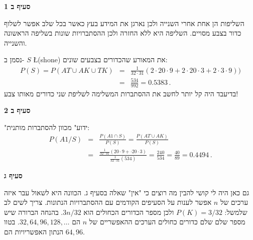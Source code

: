 \textbf{סעיף ב 1}

השליפות הן אחת אחרי השנייה ולכן נארגן את המידע בעץ כאשר בכל שלב אפשר לשלוף כדור בצבע מסויים. השליפה היא ללא החזרה ולכן ההסתברויות שונות בשליפה הראשונה והשנייה.
\begin{center}
\end{center}
נסמן ב-%
$S$ \L{(shone)}
את המאורע שהכדורים בצבעים שונים:
\begin{eqnarray*}
P(S)=P(AT\cup AK \cup TK)&=&
\frac{1}{32\cdot 31}
(2\cdot 20\cdot 9 + 2\cdot 20\cdot 3 + 2\cdot 3\cdot 9))\\[6pt]
&=&\frac{534}{992}=0.5383\,.
\end{eqnarray*}
בדיעבד היה קל יותר לחשב את ההסתברות המשלימה לשליפת שני כדורים מאותו צבע!

\textbf{סעיף ב 2}

"ידוע" מכוון להסתברות מותנית:
\begin{eqnarray*}
P(A1/S)&=&\frac{P(A1\cap S)}{P(S)}=\frac{P(AT\cup AK)}{P(S)}\\
&=&
\frac{\frac{1}{32\cdot 31}(20\cdot 9 + \cdot 20\cdot 3)}
{\frac{1}{32\cdot 31}(534)}=\frac{240}{534}=\frac{40}{89}=0.4494\,.
\end{eqnarray*}

\textbf{סעיף ג}

גם כאן היה לי קושי להבין מה רוצים כי "אין" שאלה בסעיף ג. הכוונה היא לשאול עבר איזה ערכים של 
$n$
אפשר לענות על הסעיפים הקודמים עם ההסתברויות הנתונות. צריך לשים לב שלמשל:
$P(K)=3/32$
ולכן מספר הכדורים הכחולים הוא
$3n/32$.
בהנחה הברורה שיש מספר שלם שלם כדורים כחולים הערכים ההאפשריים של 
$n$
הם
$32, 64, 96, 128,\ldots$.
בטוו הנתון האפשריויות הם
$64, 96$.